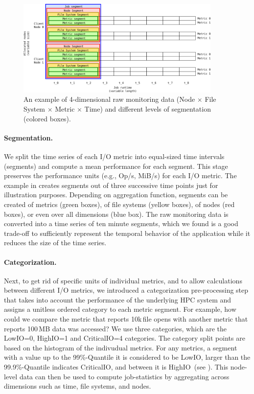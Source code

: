 \documentclass{jhps}
\begin{document}
\begin{figure}[bt]
 \centering
 \includegraphics[width=0.9\textwidth]{assets/stats3.png}
 \caption{An example of 4-dimensional raw monitoring data (Node $\times$ File System $\times$ Metric $\times$ Time) and different levels of segmentation (colored boxes).}%
 \label{fig:generic_example}
\end{figure}

\paragraph{Segmentation.}
We split the time series of each I/O metric into equal-sized time intervals (segments) and compute a mean performance for each segment.
This stage preserves the performance units (e.g., Op/s, MiB/s) for each I/O metric.
The example in  creates segments out of three successive time points just for illustration purposes.
Depending on aggregation function, segments can be created of metrics (green boxes), of file systems (yellow boxes), of nodes (red boxes), or even over all dimensions (blue box).
The raw monitoring data is converted into a time series of ten minute segments, which we found is a good trade-off to sufficiently represent the temporal behavior of the application while it reduces the size of the time series.

\paragraph{Categorization.}
Next, to get rid of specific units of individual metrics, and to allow calculations between different I/O metrics, we introduced a categorization pre-processing step that takes into account the performance of the underlying HPC system and assigns a unitless ordered category to each metric segment.
For example, how could we compare the metric that reports 10k\,file opens with another metric that reports 100\,MB data was accessed?
We use three categories, which are the LowIO=0, HighIO=1 and CriticalIO=4 categories.
The category split points are based on the histogram of the indivudual metrics.
For any metrics, a segment with a value up to the 99\%-Quantile it is considered to be LowIO, larger than the 99.9\%-Quantile indicates CriticalIO, and between it is HighIO~(see \cite{iocats2020}).
This node-level data can then be used to compute job-statistics by aggregating across dimensions such as time, file systems, and nodes.
\end{document}
